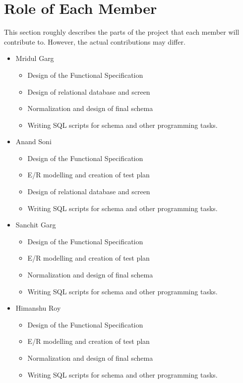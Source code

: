 \documentclass[a4paper,11pt]{article}
\begin{document}
\section{Role of Each Member}
This section roughly describes the parts of the project that each member will contribute to. However, the actual contributions may differ.
\begin{itemize}
\item Mridul Garg
\begin{itemize}
\item Design of the Functional Specification
\item Design of relational database and screen
\item Normalization and design of final schema
\item Writing SQL scripts for schema and other programming tasks.
\end{itemize}
\item Anand Soni
\begin{itemize}
\item Design of the Functional Specification
\item E/R modelling and creation of test plan 
\item Design of relational database and screen
\item Writing SQL scripts for schema and other programming tasks.
\end{itemize}
\item Sanchit Garg
\begin{itemize}
\item Design of the Functional Specification
\item E/R modelling and creation of test plan
\item Normalization and design of final schema
\item Writing SQL scripts for schema and other programming tasks.
\end{itemize}
\item Himanshu Roy
\begin{itemize}
\item Design of the Functional Specification
\item E/R modelling and creation of test plan
\item Normalization and design of final schema
\item Writing SQL scripts for schema and other programming tasks.
\end{itemize}
\end{itemize}
\end{document}
